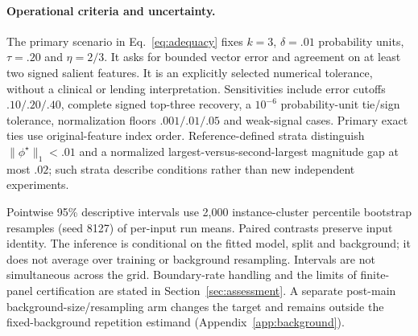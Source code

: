 \paragraph{Operational criteria and uncertainty.}
The primary scenario in Eq.~\eqref{eq:adequacy} fixes $k=3$, $\delta=.01$ probability units, $\tau=.20$ and $\eta=2/3$. It asks for bounded vector error and agreement on at least two signed salient features. It is an explicitly selected numerical tolerance, without a clinical or lending interpretation. Sensitivities include error cutoffs $.10/.20/.40$, complete signed top-three recovery, a $10^{-6}$ probability-unit tie/sign tolerance, normalization floors $.001/.01/.05$ and weak-signal cases. Primary exact ties use original-feature index order. Reference-defined strata distinguish $\|\phi^\star\|_1<.01$ and a normalized largest-versus-second-largest magnitude gap at most $.02$; such strata describe conditions rather than new independent experiments.

Pointwise 95\% descriptive intervals use 2,000 instance-cluster percentile bootstrap resamples (seed 8127) of per-input run means. Paired contrasts preserve input identity. The inference is conditional on the fitted model, split and background; it does not average over training or background resampling. Intervals are not simultaneous across the grid. Boundary-rate handling and the limits of finite-panel certification are stated in Section~\ref{sec:assessment}. A separate post-main background-size/resampling arm changes the target and remains outside the fixed-background repetition estimand (Appendix~\ref{app:background}).
